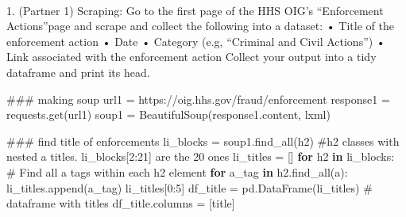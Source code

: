 \documentclass[
  letterpaper,
  DIV=11,
  numbers=noendperiod]{scrartcl}
\makeatletter
\let\oldparagraph\paragraph
\renewcommand{\paragraph}{
    \@ifstar
      \xxxParagraphStar
      \xxxParagraphNoStar
  }
\newcommand{\xxxParagraphStar}[1]{\oldparagraph*{#1}\mbox{}}
\newcommand{\xxxParagraphNoStar}[1]{\oldparagraph{#1}\mbox{}}
\newenvironment{Shaded}{\begin{snugshade}}{\end{snugshade}}
\newcommand{\CommentTok}[1]{\textcolor[rgb]{0.37,0.37,0.37}{#1}}
\newcommand{\ControlFlowTok}[1]{\textcolor[rgb]{0.00,0.23,0.31}{\textbf{#1}}}
\newcommand{\DecValTok}[1]{\textcolor[rgb]{0.68,0.00,0.00}{#1}}
\newcommand{\KeywordTok}[1]{\textcolor[rgb]{0.00,0.23,0.31}{\textbf{#1}}}
\newcommand{\NormalTok}[1]{\textcolor[rgb]{0.00,0.23,0.31}{#1}}
\newcommand{\OperatorTok}[1]{\textcolor[rgb]{0.37,0.37,0.37}{#1}}
\newcommand{\StringTok}[1]{\textcolor[rgb]{0.13,0.47,0.30}{#1}}
\makeatother
\begin{document}
\paragraph{1. (Partner 1) Scraping: Go to the first page of the HHS
OIG's ``Enforcement Actions''page and scrape and collect the following
into a dataset: • Title of the enforcement action • Date • Category
(e.g, ``Criminal and Civil Actions'') • Link associated with the
enforcement action Collect your output into a tidy dataframe and print
its
head.}\label{partner-1-scraping-go-to-the-first-page-of-the-hhs-oigs-enforcement-actionspage-and-scrape-and-collect-the-following-into-a-dataset-title-of-the-enforcement-action-date-category-e.g-criminal-and-civil-actions-link-associated-with-the-enforcement-action-collect-your-output-into-a-tidy-dataframe-and-print-its-head.}

\begin{Shaded}
\begin{Highlighting}[]
\CommentTok{\#\#\# making soup}
\NormalTok{url1 }\OperatorTok{=} \StringTok{\textquotesingle{}https://oig.hhs.gov/fraud/enforcement\textquotesingle{}}
\NormalTok{response1 }\OperatorTok{=}\NormalTok{ requests.get(url1)}
\NormalTok{soup1 }\OperatorTok{=}\NormalTok{ BeautifulSoup(response1.content, }\StringTok{\textquotesingle{}lxml\textquotesingle{}}\NormalTok{)}
\end{Highlighting}
\end{Shaded}

\begin{Shaded}
\begin{Highlighting}[]
\CommentTok{\#\#\# find title of enforcements}
\NormalTok{li\_blocks }\OperatorTok{=}\NormalTok{ soup1.find\_all(}\StringTok{\textquotesingle{}h2\textquotesingle{}}\NormalTok{) }\CommentTok{\#h2 classes with nested \textquotesingle{}a\textquotesingle{} titles. li\_blocks[2:21] are the 20 ones}
\NormalTok{li\_titles }\OperatorTok{=}\NormalTok{ []}
\ControlFlowTok{for}\NormalTok{ h2 }\KeywordTok{in}\NormalTok{ li\_blocks:}
    \CommentTok{\# Find all \textquotesingle{}a\textquotesingle{} tags within each \textquotesingle{}h2\textquotesingle{} element}
    \ControlFlowTok{for}\NormalTok{ a\_tag }\KeywordTok{in}\NormalTok{ h2.find\_all(}\StringTok{\textquotesingle{}a\textquotesingle{}}\NormalTok{):}
\NormalTok{        li\_titles.append(a\_tag)}
\NormalTok{li\_titles[}\DecValTok{0}\NormalTok{:}\DecValTok{5}\NormalTok{]}
\NormalTok{df\_title }\OperatorTok{=}\NormalTok{ pd.DataFrame(li\_titles) }\CommentTok{\# dataframe with titles}
\NormalTok{df\_title.columns }\OperatorTok{=}\NormalTok{ [}\StringTok{\textquotesingle{}title\textquotesingle{}}\NormalTok{]}
\end{Highlighting}
\end{Shaded}
\end{document}
